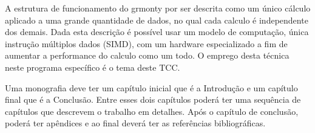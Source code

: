 A estrutura de funcionamento do grmonty por ser descrita como um único cálculo
aplicado a uma grande quantidade de dados, no qual cada calculo é independente
dos demais. Dada esta descrição é possível usar um modelo de computação, única
instrução múltiplos dados (SIMD), com um hardware especializado a fim de
aumentar a performance do calculo como um todo. O emprego desta técnica neste
programa específico é o tema deste TCC.

Uma monografia deve ter um capítulo inicial que é a Introdução e um
capítulo final que é a Conclusão. Entre esses dois capítulos poderá
ter uma sequência de capítulos que descrevem o trabalho em detalhes.
Após o capítulo de conclusão, poderá ter apêndices e ao final deverá
ter as referências bibliográficas.

